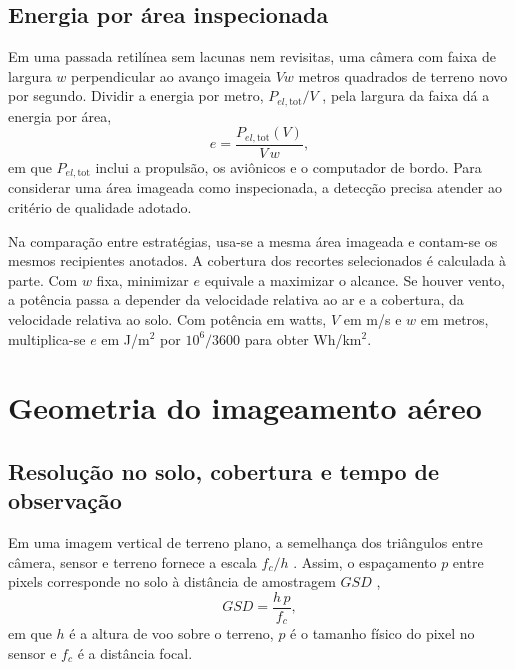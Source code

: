 \subsection{Energia por área inspecionada}

Em uma passada retilínea sem lacunas nem revisitas, uma câmera com faixa de largura $w$ perpendicular ao avanço imageia $Vw$ metros quadrados de terreno novo por segundo. Dividir a energia por metro, $P_{el,\mathrm{tot}}/V$ \cite{zeng2019energia}, pela largura da faixa dá a energia por área,
\begin{equation}
  e = \frac{P_{el,\mathrm{tot}}(V)}{V\,w},
  \label{eq_e_area}
\end{equation}
em que $P_{el,\mathrm{tot}}$ inclui a propulsão, os aviônicos e o computador de bordo. Para considerar uma área imageada como inspecionada, a detecção precisa atender ao critério de qualidade adotado.

Na comparação entre estratégias, usa-se a mesma área imageada e contam-se os mesmos recipientes anotados. A cobertura dos recortes selecionados é calculada à parte. Com $w$ fixa, minimizar $e$ equivale a maximizar o alcance. Se houver vento, a potência passa a depender da velocidade relativa ao ar e a cobertura, da velocidade relativa ao solo. Com potência em watts, $V$ em m/s e $w$ em metros, multiplica-se $e$ em J/m$^2$ por $10^6/3600$ para obter Wh/km$^2$.

\section{Geometria do imageamento aéreo}
\label{sec_imageamento}

\subsection{Resolução no solo, cobertura e tempo de observação}

Em uma imagem vertical de terreno plano, a semelhança dos triângulos entre câmera, sensor e terreno fornece a escala $f_c/h$ \cite[p.~75]{paine2012}. Assim, o espaçamento $p$ entre pixels corresponde no solo à distância de amostragem $GSD$ \cite{cabreira2019survey},
\begin{equation}
  GSD = \frac{h\,p}{f_c},
  \label{eq_gsd}
\end{equation}
em que $h$ é a altura de voo sobre o terreno, $p$ é o tamanho físico do pixel no sensor e $f_c$ é a distância focal.

